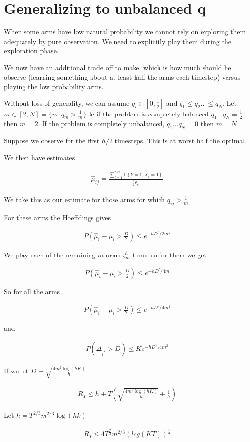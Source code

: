 \documentclass{article}
\newcommand{\set}[1]{\left\{#1\right\}}
\newcommand{\ind}[1]{\mathds{1}\!\!\set{#1}}
\newcommand{\eqn}[1]{\begin{align}#1\end{align}}
\theoremstyle{plain}
\theoremstyle{definition}
\begin{document}
\section{Generalizing to unbalanced $\boldsymbol{q}$}

When some arms have low natural probability we cannot rely on exploring them adequately by pure observation. We need to explicitly play them during the exploration phase. 

We now have an additional trade off to make, which is how much should be observe (learning something about at least half the arms each timestep) versus playing the low probability arms. 

Without loss of generality, we can assume $q_i \in [0,\frac{1}{2}]$ and $q_1 \leq q_2 ... \leq q_N$. Let $m \in [2,N] = \{m:q_m > \frac{1}{m}\}$ Ie if the problem is completely balanced $q_1...q_N = \frac{1}{2}$ then $m = 2$. If the problem is completely unbalanced, $q_1...q_N = 0$ then $m=N$

Suppose we observe for the first $h/2$ timesteps. This is at worst half the optimal. 

We then have estimates 

\eqn {
\hat{\mu}_{ij} = \frac{\sum_{t=1}^{h/2}\ind{Y=1,X_i=1}}{\frac{h}{2}q_{ij}}
}

We take this as our estimate for those arms for which $q_{ij} > \frac{1}{m}$

For these arms the Hoeffdings gives 

\eqn{
P(\hat{\mu}_i - \mu_{i} > \frac{D}{2}) \leq e^{-hD^2/2m^2}
}

We play each of the remaining $m$ arms $\frac{h}{2m}$ times so for them we get

\eqn{
P(\hat{\mu}_i - \mu_{i} > \frac{D}{2}) \leq e^{-hD^2/4m}
}

So for all the arms 

\eqn{
P(\hat{\mu}_i - \mu_{i} > \frac{D}{2}) \leq e^{-hD^2/4m^2}
}

and 



\eqn{
\label{eqn:unbalancedHoeffdings}
P(\Delta_{\hat{i^*}} > D) \leq Ke^{-hD^2/4m^2}
}

If we let $D = \sqrt{\frac{4m^2\log(hK)}{h}}$

\eqn{
R_T  \leq h + T\left(\sqrt{\frac{4m^2\log(hK)}{h}} + \frac{1}{h}\right)
}

Let $h = T^{2/3}m^{2/3}\log(hk)$


\eqn {
R_T  \leq 4T^{\frac{2}{3}}m^{2/3}(log(KT))^{\frac{1}{3}}
}
\end{document}

